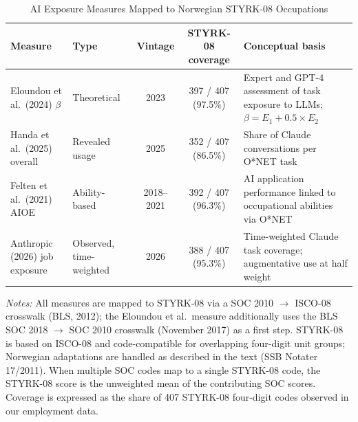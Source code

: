 \begin{table}[htbp]
\centering
\caption{AI Exposure Measures Mapped to Norwegian STYRK-08 Occupations}
\label{tab:measures}
\footnotesize
\begin{tabular}{p{3cm}p{2.2cm}ccp{4.5cm}}
\toprule
Measure & Type & Vintage & STYRK-08 coverage & Conceptual basis \\
\midrule
Eloundou et al.\ (2024) $\beta$ & Theoretical & 2023 & 397 / 407 (97.5\%) & Expert and GPT-4 assessment of task exposure to LLMs; $\beta = E_1 + 0.5 \times E_2$ \\[4pt]
Handa et al.\ (2025) overall & Revealed usage & 2025 & 352 / 407 (86.5\%) & Share of Claude conversations per O*NET task \\[4pt]
Felten et al.\ (2021) AIOE & Ability-based & 2018--2021 & 392 / 407 (96.3\%) & AI application performance linked to occupational abilities via O*NET \\[4pt]
Anthropic (2026) job exposure & Observed, time-weighted & 2026 & 388 / 407 (95.3\%) & Time-weighted Claude task coverage; augmentative use at half weight \\
\bottomrule
\end{tabular}
\par\smallskip\footnotesize
\raggedright\textit{Notes:} All measures are mapped to STYRK-08 via a SOC 2010 $\to$ ISCO-08 crosswalk (BLS, 2012); the Eloundou et al.\ measure additionally uses the BLS SOC 2018 $\to$ SOC 2010 crosswalk (November 2017) as a first step. STYRK-08 is based on ISCO-08 and code-compatible for overlapping four-digit unit groups; Norwegian adaptations are handled as described in the text (SSB Notater 17/2011). When multiple SOC codes map to a single STYRK-08 code, the STYRK-08 score is the unweighted mean of the contributing SOC scores. Coverage is expressed as the share of 407 STYRK-08 four-digit codes observed in our employment data.
\end{table}
